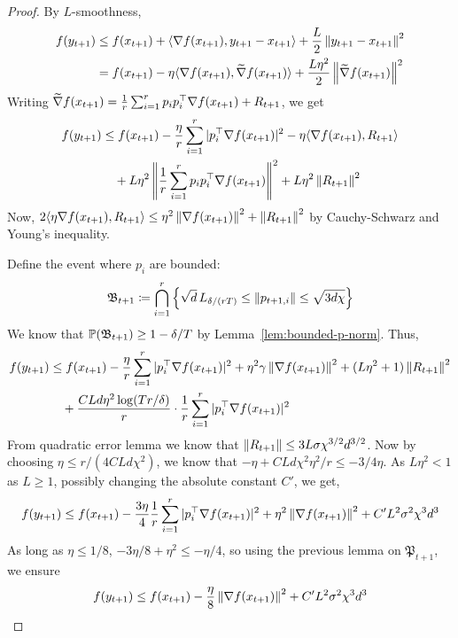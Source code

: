 \begin{proof}
    By $L$-smoothness,
    \begin{align*}
        f(y_{t+1}) &\leq f(x_{t+1}) + \langle \grad f(x_{t+1}), y_{t+1} - x_{t+1} \rangle + \frac{L}{2} \mg{y_{t+1} - x_{t+1}}^2 \\
        &= f(x_{t+1}) - \eta \langle \grad f(x_{t+1}), \widetilde{\grad} f(x_{t+1}) \rangle + \frac{L\eta^2}{2} \mg{\widetilde{\grad} f(x_{t+1})}^2
    \end{align*}
    Writing $\widetilde{\grad} f(x_{t+1}) = \frac 1r \sum_{i=1}^r p_ip_i^\top \grad f(x_{t+1}) + R_{t+1}$, we get
    \begin{align*}
        f(y_{t+1}) &\leq f(x_{t+1}) - \frac{\eta}{r} \sum_{i=1}^r|p_i^\top \grad f(x_{t+1})|^2 - \eta \langle \grad f(x_{t+1}), R_{t+1} \rangle   \\
        &\quad +L \eta^2 \mg{\frac 1r \sum_{i=1}^r p_ip_i^\top \grad f(x_{t+1})}^2 + L \eta^2 \mg{R_{t+1}}^2
    \end{align*}
    Now, $2\langle \eta \grad f(x_{t+1}), R_{t+1} \rangle \leq \eta^2 \mg{\grad f(x_{t+1})}^2 + \mg{R_{t+1}}^2$ by Cauchy-Schwarz and Young's inequality.

    Define the event where $p_i$ are bounded:
    \begin{align*}
        \mathfrak B_{t+1} \coloneqq \bigcap_{i=1}^r \set{\sqrt d\,L_{\delta/(rT)} \leq \mg{p_{t+1,i}} \leq \sqrt{3d \chi}}
    \end{align*}
    We know that $\P(\mathfrak B_{t+1}) \geq 1 - \delta/T$ by Lemma~\ref{lem:bounded-p-norm}. Thus,
    \begin{align*}
        f(y_{t+1}) &\leq f(x_{t+1}) - \frac{\eta}{r} \sum_{i=1}^r |p_i^\top \grad f(x_{t+1})|^2 + \eta^2 \gamma \mg{\grad f(x_{t+1})}^2 + (L\eta^2 + 1)\mg{R_{t+1}}^2 \\
        &\quad + \frac{CLd \eta^2  \log(Tr/\delta)}{r} \cdot \frac 1r \sum_{i=1}^r |p_i^\top \grad f(x_{t+1})|^2
    \end{align*}
    From quadratic error lemma we know that $\mg{R_{t+1}} \leq 3L \sigma \chi^{3/2} d^{3/2}$. Now by choosing $\eta \leq r/(4CLd \chi^2)$, we know that $-\eta + CLd \chi^2 \eta^2 / r  \leq -3/4\eta$. As $L\eta^2 < 1$ as $L \geq 1$, possibly changing the absolute constant $C'$, we get,
    \begin{align*}
        f(y_{t+1}) \leq f(x_{t+1}) - \frac{3\eta}{4} \frac 1r \sum_{i=1}^r |p_i^\top \grad f(x_{t+1})|^2 + \eta^2 \mg{\grad f(x_{t+1})}^2 + C'L^2 \sigma^2 \chi^3 d^{3} 
    \end{align*} 
    As long as  $\eta \leq 1/8$, $-3\eta/8 + \eta^2 \leq -\eta/4$, so using the previous lemma on $\mathfrak P_{t+1}$, we ensure
    \begin{align*}
        f(y_{t+1}) \leq f(x_{t+1}) - \frac{\eta}{8} \mg{\grad f(x_{t+1})}^2 + C'L^2 \sigma^2 \chi^3 d^{3} 
    \end{align*}
\end{proof}

